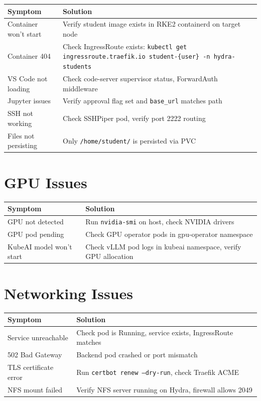\documentclass[11pt,a4paper]{article}
\begin{document}
\begin{table}[H]
\centering
\begin{tabular}{lp{8cm}}
\toprule
\textbf{Symptom} & \textbf{Solution} \\
\midrule
Container won't start & Verify student image exists in RKE2 containerd on target node \\
Container 404 & Check IngressRoute exists: \texttt{kubectl get ingressroute.traefik.io student-\{user\} -n hydra-students} \\
VS Code not loading & Check code-server supervisor status, ForwardAuth middleware \\
Jupyter issues & Verify approval flag set and \texttt{base\_url} matches path \\
SSH not working & Check SSHPiper pod, verify port 2222 routing \\
Files not persisting & Only \texttt{/home/student/} is persisted via PVC \\
\bottomrule
\end{tabular}
\end{table}

\section{GPU Issues}

\begin{table}[H]
\centering
\begin{tabular}{lp{8cm}}
\toprule
\textbf{Symptom} & \textbf{Solution} \\
\midrule
GPU not detected & Run \texttt{nvidia-smi} on host, check NVIDIA drivers \\
GPU pod pending & Check GPU operator pods in gpu-operator namespace \\
KubeAI model won't start & Check vLLM pod logs in kubeai namespace, verify GPU allocation \\
\bottomrule
\end{tabular}
\end{table}

\section{Networking Issues}

\begin{table}[H]
\centering
\begin{tabular}{lp{8cm}}
\toprule
\textbf{Symptom} & \textbf{Solution} \\
\midrule
Service unreachable & Check pod is Running, service exists, IngressRoute matches \\
502 Bad Gateway & Backend pod crashed or port mismatch \\
TLS certificate error & Run \texttt{certbot renew --dry-run}, check Traefik ACME \\
NFS mount failed & Verify NFS server running on Hydra, firewall allows 2049 \\
\bottomrule
\end{tabular}
\end{table}
\end{document}
